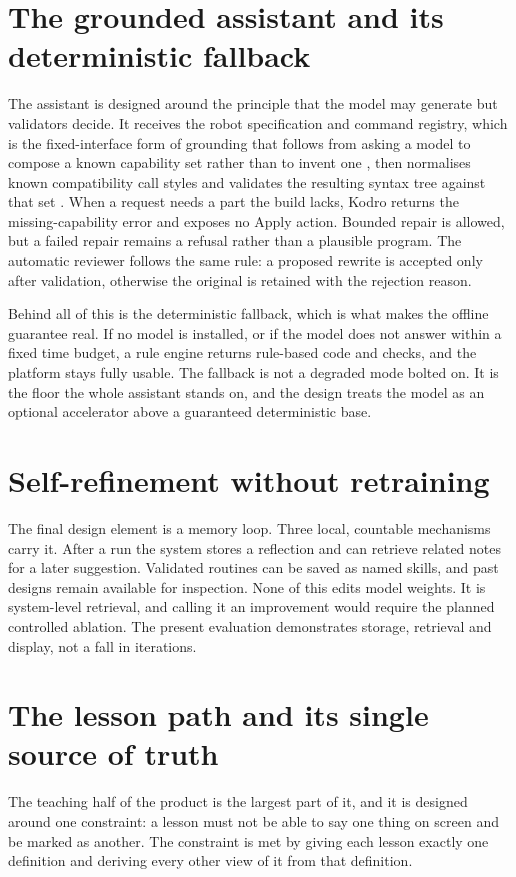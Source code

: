 \documentclass[11pt,a4paper]{report}
\begin{document}
\section{The grounded assistant and its deterministic fallback}
\label{sec:assistant}
The assistant is designed around the principle that the model may generate but validators decide. It receives the robot specification and command registry, which is the fixed-interface form of grounding that follows from asking a model to compose a known capability set rather than to invent one \citep{liang2023,ahn2022}, then normalises known compatibility call styles and validates the resulting syntax tree against that set \citep{khati2026}. When a request needs a part the build lacks, Kodro returns the missing-capability error and exposes no Apply action. Bounded repair is allowed, but a failed repair remains a refusal rather than a plausible program. The automatic reviewer follows the same rule: a proposed rewrite is accepted only after validation, otherwise the original is retained with the rejection reason.

Behind all of this is the deterministic fallback, which is what makes the offline guarantee real. If no model is installed, or if the model does not answer within a fixed time budget, a rule engine returns rule-based code and checks, and the platform stays fully usable. The fallback is not a degraded mode bolted on. It is the floor the whole assistant stands on, and the design treats the model as an optional accelerator above a guaranteed deterministic base.

\section{Self-refinement without retraining}
The final design element is a memory loop. Three local, countable mechanisms carry it. After a run the system stores a reflection and can retrieve related notes for a later suggestion. Validated routines can be saved as named skills, and past designs remain available for inspection. None of this edits model weights. It is system-level retrieval, and calling it an improvement would require the planned controlled ablation. The present evaluation demonstrates storage, retrieval and display, not a fall in iterations.

\section{The lesson path and its single source of truth}
\label{sec:lesson-design}
The teaching half of the product is the largest part of it, and it is designed around one constraint: a lesson must not be able to say one thing on screen and be marked as another. The constraint is met by giving each lesson exactly one definition and deriving every other view of it from that definition.
\end{document}
